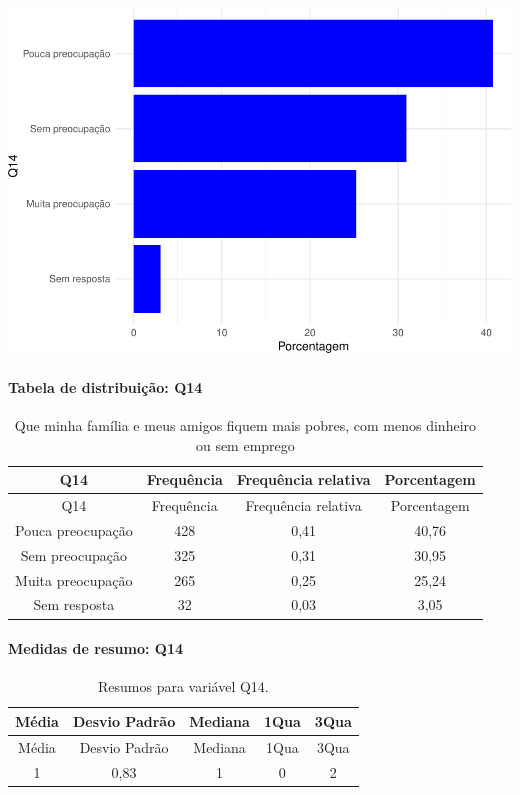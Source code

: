 \documentclass[]{article}
\let\oldparagraph\paragraph
\renewcommand{\paragraph}[1]{\oldparagraph{#1}\mbox{}}
\begin{document}
\begin{center}\includegraphics[width=0.75\linewidth]{relatorio_covid19_files/figure-latex/unnamed-chunk-9-1} \end{center}

\hypertarget{tabela-de-distribuiuxe7uxe3o-q14}{%
\paragraph{Tabela de distribuição: Q14}\label{tabela-de-distribuiuxe7uxe3o-q14}}

\begin{longtable}[]{@{}cccc@{}}
\caption{\label{tab:unnamed-chunk-10}Que minha família e meus amigos fiquem mais pobres, com menos dinheiro ou sem emprego}\tabularnewline
\toprule
Q14 & Frequência & Frequência relativa & Porcentagem\tabularnewline
\midrule
\endfirsthead
\toprule
Q14 & Frequência & Frequência relativa & Porcentagem\tabularnewline
\midrule
\endhead
Pouca preocupação & 428 & 0,41 & 40,76\tabularnewline
Sem preocupação & 325 & 0,31 & 30,95\tabularnewline
Muita preocupação & 265 & 0,25 & 25,24\tabularnewline
Sem resposta & 32 & 0,03 & 3,05\tabularnewline
\bottomrule
\end{longtable}

\hypertarget{medidas-de-resumo-q14}{%
\paragraph{Medidas de resumo: Q14}\label{medidas-de-resumo-q14}}

\begin{longtable}[]{@{}ccccc@{}}
\caption{\label{tab:unnamed-chunk-11}Resumos para variável Q14.}\tabularnewline
\toprule
Média & Desvio Padrão & Mediana & 1Qua & 3Qua\tabularnewline
\midrule
\endfirsthead
\toprule
Média & Desvio Padrão & Mediana & 1Qua & 3Qua\tabularnewline
\midrule
\endhead
1 & 0,83 & 1 & 0 & 2\tabularnewline
\bottomrule
\end{longtable}
\end{document}
